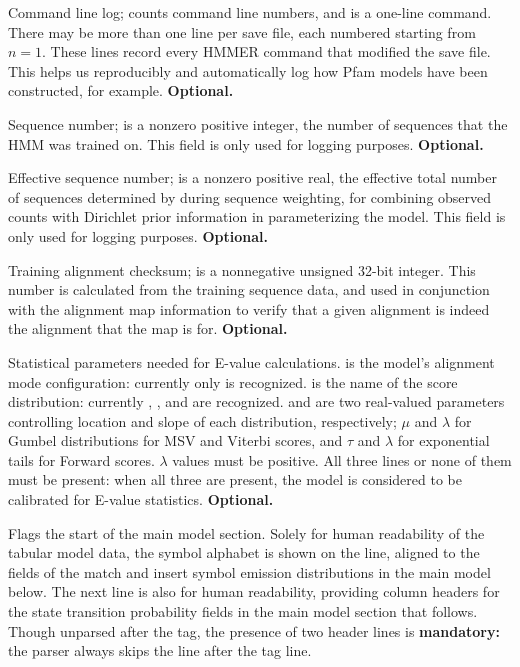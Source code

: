 \begin{sreitems}{}
\item [\emprog{COM [<n>] <s>}] Command line log;  counts
command line numbers, and  is a one-line command. There may
be more than one  line per save file, each numbered starting
from $n=1$. These lines record every HMMER command that modified the
save file. This helps us reproducibly and automatically log how Pfam
models have been constructed, for example. \textbf{Optional.}

\item [\emprog{NSEQ  <d>}] Sequence number;  is a nonzero
positive integer, the number of sequences that the HMM was trained on.
This field is only used for logging purposes.
\textbf{Optional.}

\item [\emprog{EFFN <f>}] Effective sequence number;  is a
nonzero positive real, the effective total number of sequences
determined by  during sequence weighting, for combining
observed counts with Dirichlet prior information in parameterizing the
model. This field is only used for logging purposes.
\textbf{Optional.}

\item [\emprog{CKSUM <d>}] Training alignment checksum;  is
  a nonnegative unsigned 32-bit integer. This number is calculated
  from the training sequence data, and used in conjunction with the
  alignment map information to verify that a given alignment is indeed
  the alignment that the map is for. \textbf{Optional.}

\item [\emprog{STATS <s1> <s2> <f1> <f2>}] Statistical parameters
  needed for E-value calculations.  is the model's
  alignment mode configuration: currently only  is
  recognized.  is the name of the score distribution:
  currently , , and  are
  recognized.   and  are two real-valued
  parameters controlling location and slope of each distribution,
  respectively; $\mu$ and $\lambda$ for Gumbel distributions for MSV
  and Viterbi scores, and $\tau$ and $\lambda$ for exponential tails
  for Forward scores.  $\lambda$ values must be positive.  All three
  lines or none of them must be present: when all three are present,
  the model is considered to be calibrated for E-value
  statistics. \textbf{Optional.}

\item [\emprog{HMM }] Flags the start of the main model
section. Solely for human readability of the tabular model data, the
symbol alphabet is shown on the  line, aligned to the fields
of the match and insert symbol emission distributions in the main
model below. The next line is also for human readability, providing
column headers for the state transition probability fields in the main
model section that follows. Though unparsed after the  tag,
the presence of two header lines is \textbf{mandatory:} the parser
always skips the line after the  tag line.


\end{sreitems}
